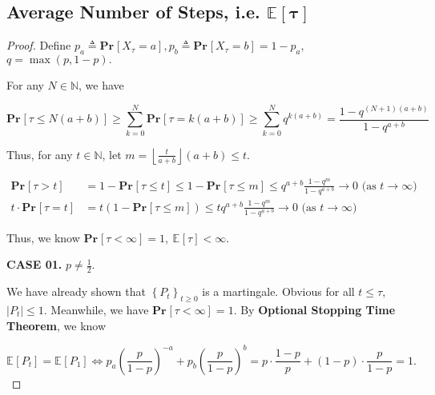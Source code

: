 \documentclass{article}
\renewcommand{\Pr}[2]{\mathbf{Pr}_{#1}\left[#2\right]}
\newcommand{\set}[1]{\left\{#1\right\}}
\newcommand{\staExp}[2]{\mathbb{E}_{#1}\left[#2\right]}
\begin{document}
\subsection{Average Number of Steps, i.e. $\boldsymbol{\staExp{}{\tau}}$}
\vspace{1em}
\begin{proof}
    Define $p_a\triangleq\Pr{}{X_{\tau}=a}, p_b\triangleq\Pr{}{X_{\tau}=b}=1-p_a$, $q=\max(p,1-p).$

    \vspace{0.3em} \hspace{1.3em}
    For any $N\in\mathbb{N}$, we have 
    
    \vspace{-0.5em}
    $$\Pr{}{\tau\le N(a+b)}\geq\sum_{k=0}^{N}\Pr{}{\tau=k(a+b)}\geq\sum_{k=0}^{N}q^{k(a+b)} = \frac{1-q^{(N+1)(a+b)}}{1-q^{a+b}}$$
    
    \vspace{-0em} \hspace{1.3em}
    Thus, for any $t\in\mathbb{N}$, let $m=\left\lfloor\frac{t}{a+b}\right\rfloor(a+b)\le t.$
    
    \vspace{-2em}
    \begin{align*}
        \Pr{}{\tau>t} &= 1-\Pr{}{\tau\le t}\le 1-\Pr{}{\tau\le m}\le q^{a+b}\frac{1-q^m}{1-q^{a+b}}\rightarrow 0\text{ (as } t\rightarrow\infty\text{) } \\
        t\cdot\Pr{}{\tau=t} &= t(1-\Pr{}{\tau\le m})\le tq^{a+b}\frac{1-q^m}{1-q^{a+b}}\rightarrow 0\text{ (as } t\rightarrow\infty\text{) }
    \end{align*}
    
    \vspace{-0em} \hspace{1.3em}
    Thus, we know $\Pr{}{\tau<\infty}=1,\ \staExp{}{\tau}<\infty.$ 
        
    \vspace{2em} \hspace{1.3em}
    \textbf{CASE 01.} $p\neq\frac{1}{2}.$ 
    
    \hspace{1.3em}
    We have already shown that $\set{P_t}_{t\geq0}$ is a martingale. Obvious for all $t\le\tau$, $|P_t|\le 1.$ Meanwhile, we have $\Pr{}{\tau<\infty}=1.$ By \textbf{Optional Stopping Time Theorem}, we know
    
    \vspace{-1em}
    $$\staExp{}{P_t}=\staExp{}{P_1} \Longleftrightarrow p_a\left(\frac{p}{1-p}\right)^{-a}+p_b\left(\frac{p}{1-p}\right)^b=p\cdot\frac{1-p}{p}+(1-p)\cdot\frac{p}{1-p}=1.$$
    

\end{proof}
\end{document}

